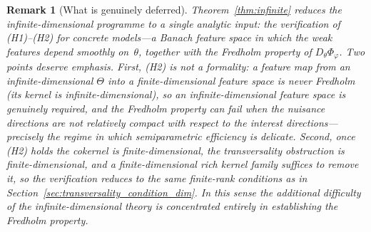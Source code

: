 \documentclass[11pt,a4paper]{article}
\newtheorem{remark}[theorem]{Remark}
\begin{document}
\begin{remark}[What is genuinely deferred]
\label{rem:deferred-fredholm}
Theorem~\ref{thm:infinite} reduces the infinite-dimensional programme to a
single analytic input: the verification of \textnormal{(H1)--(H2)} for concrete
models---a Banach feature space in which the weak features depend smoothly
on~$\theta$, together with the Fredholm property of $D_\theta\Phi_\varphi$.  Two
points deserve emphasis.  First, \textnormal{(H2)} is not a formality: a feature
map from an infinite-dimensional $\Theta$ into a \emph{finite}-dimensional
feature space is never Fredholm (its kernel is infinite-dimensional), so an
infinite-dimensional feature space is genuinely required, and the Fredholm
property can fail when the nuisance directions are not relatively compact with
respect to the interest directions---precisely the regime in which
semiparametric efficiency is delicate.  Second, \emph{once}
\textnormal{(H2)} holds the cokernel is finite-dimensional, the transversality
obstruction is finite-dimensional, and a finite-dimensional rich kernel family
suffices to remove it, so the verification reduces to the same finite-rank
conditions as in Section~\ref{sec:transversality_condition_dim}.  In this sense
the additional difficulty of the infinite-dimensional theory is concentrated
entirely in establishing the Fredholm property.
\end{remark}
\end{document}
